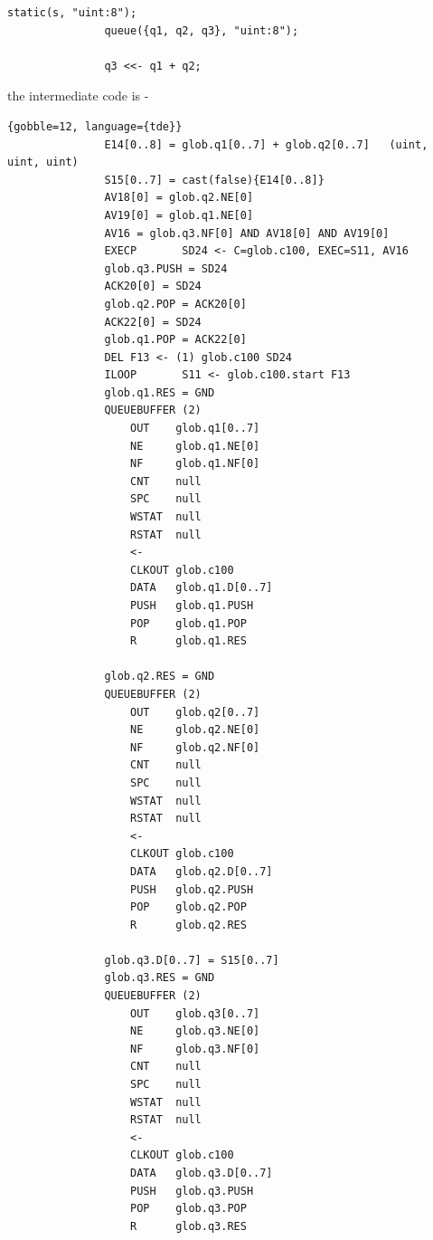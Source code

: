             \begin{lstlisting}[gobble=12, language=threepl]
               static(s, "uint:8");
               queue({q1, q2, q3}, "uint:8");

               q3 <<- q1 + q2;
            \end{lstlisting}
            the intermediate code is -
            \begin{lstlisting}{gobble=12, language={tde}}
               E14[0..8] = glob.q1[0..7] + glob.q2[0..7]   (uint, uint, uint)
               S15[0..7] = cast(false){E14[0..8]}
               AV18[0] = glob.q2.NE[0]
               AV19[0] = glob.q1.NE[0]
               AV16 = glob.q3.NF[0] AND AV18[0] AND AV19[0]
               EXECP       SD24 <- C=glob.c100, EXEC=S11, AV16
               glob.q3.PUSH = SD24
               ACK20[0] = SD24
               glob.q2.POP = ACK20[0]
               ACK22[0] = SD24
               glob.q1.POP = ACK22[0]
               DEL F13 <- (1) glob.c100 SD24
               ILOOP       S11 <- glob.c100.start F13
               glob.q1.RES = GND
               QUEUEBUFFER (2)
                   OUT    glob.q1[0..7]
                   NE     glob.q1.NE[0]
                   NF     glob.q1.NF[0]
                   CNT    null
                   SPC    null
                   WSTAT  null
                   RSTAT  null
                   <-
                   CLKOUT glob.c100
                   DATA   glob.q1.D[0..7]
                   PUSH   glob.q1.PUSH
                   POP    glob.q1.POP
                   R      glob.q1.RES

               glob.q2.RES = GND
               QUEUEBUFFER (2)
                   OUT    glob.q2[0..7]
                   NE     glob.q2.NE[0]
                   NF     glob.q2.NF[0]
                   CNT    null
                   SPC    null
                   WSTAT  null
                   RSTAT  null
                   <-
                   CLKOUT glob.c100
                   DATA   glob.q2.D[0..7]
                   PUSH   glob.q2.PUSH
                   POP    glob.q2.POP
                   R      glob.q2.RES

               glob.q3.D[0..7] = S15[0..7]
               glob.q3.RES = GND
               QUEUEBUFFER (2)
                   OUT    glob.q3[0..7]
                   NE     glob.q3.NE[0]
                   NF     glob.q3.NF[0]
                   CNT    null
                   SPC    null
                   WSTAT  null
                   RSTAT  null
                   <-
                   CLKOUT glob.c100
                   DATA   glob.q3.D[0..7]
                   PUSH   glob.q3.PUSH
                   POP    glob.q3.POP
                   R      glob.q3.RES
            \end{lstlisting}

